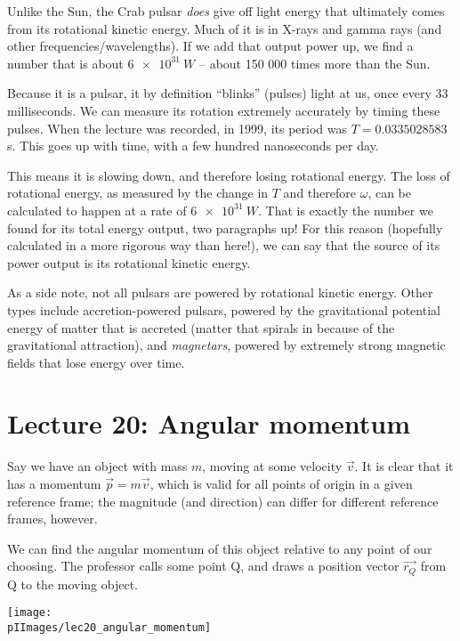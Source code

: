 Unlike the Sun, the Crab pulsar \emph{does} give off light energy that ultimately comes from its rotational kinetic energy. Much of it is in X-rays and gamma rays (and other frequencies/wavelengths). If we add that output power up, we find a number that is about $\SI{6e31}{W}$ -- about 150 000 times more than the Sun.

Because it is a pulsar, it by definition ``blinks'' (pulses) light at us, once every 33 milliseconds. We can measure its rotation extremely accurately by timing these pulses. When the lecture was recorded, in 1999, its period was $T = 0.0335028583$ s. This goes up with time, with a few hundred nanoseconds per day.

This means it is slowing down, and therefore losing rotational energy. The loss of rotational energy, as measured by the change in $T$ and therefore $\omega$, can be calculated to happen at a rate of $\SI{6e31}{W}$. That is exactly the number we found for its total energy output, two paragraphs up! For this reason (hopefully calculated in a more rigorous way than here!), we can say that the source of its power output is its rotational kinetic energy.

As a side note, not all pulsars are powered by rotational kinetic energy. Other types include accretion-powered pulsars, powered by the gravitational potential energy of matter that is accreted (matter that spirals in because of the gravitational attraction), and \emph{magnetars}, powered by extremely strong magnetic fields that lose energy over time.

\section{Lecture 20: Angular momentum}

Say we have an object with mass $m$, moving at some velocity $\vec{v}$. It is clear that it has a momentum $\vec{p} = m \vec{v}$, which is valid for all points of origin in a given reference frame; the magnitude (and direction) can differ for different reference frames, however.

We can find the angular momentum of this object relative to any point of our choosing. The professor calls some point Q, and draws a position vector $\vec{r_Q}$ from Q to the moving object.

\begin{center}
\texttt{[image: \\pIImages/lec20\_angular\_momentum]}
\end{center}

